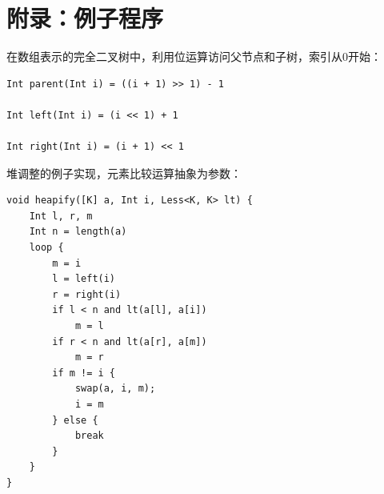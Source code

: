 \documentclass[b5paper]{ctexart}
\begin{document}
\section{附录：例子程序}

在数组表示的完全二叉树中，利用位运算访问父节点和子树，索引从0开始：

\begin{lstlisting}[language = Bourbaki]
Int parent(Int i) = ((i + 1) >> 1) - 1

Int left(Int i) = (i << 1) + 1

Int right(Int i) = (i + 1) << 1
\end{lstlisting}

堆调整的例子实现，元素比较运算抽象为参数：

\begin{lstlisting}[language = Bourbaki]
void heapify([K] a, Int i, Less<K, K> lt) {
    Int l, r, m
    Int n = length(a)
    loop {
        m = i
        l = left(i)
        r = right(i)
        if l < n and lt(a[l], a[i])
            m = l
        if r < n and lt(a[r], a[m])
            m = r
        if m != i {
            swap(a, i, m);
            i = m
        } else {
            break
        }
    }
}
\end{lstlisting}
\end{document}
